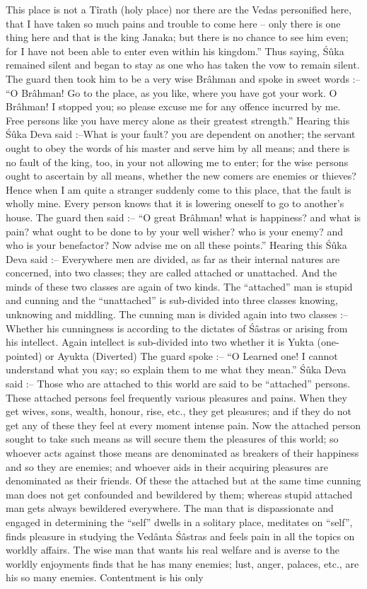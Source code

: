 This place is not a T\^irath (holy place) nor there are the Vedas personified here, that I have taken so much pains and trouble to come here -- only there is one thing here and that is the king Janaka; but there is no chance to see him even; for I have not been able to enter even within his kingdom.'' Thus saying, \'S\^uka remained silent and began to stay as one who has taken the vow to remain silent. The guard then took him to be a very wise Br\^ahman and spoke in sweet words :-- ``O Br\^ahman! Go to the place, as you like, where you have got your work. O Br\^ahman! I stopped you; so please excuse me for any offence incurred by me. Free persons like you have mercy alone as their greatest strength.'' Hearing this \'S\^uka Deva said :--What is your fault? you are dependent on another; the servant ought to obey the words of his master and serve him by all means; and there is no fault of the king, too, in your not allowing me to enter; for the wise persons ought to ascertain by all means, whether the new comers are enemies or thieves? Hence when I am quite a stranger suddenly come to this place, that the fault is wholly mine. Every person knows that it is lowering oneself to go to another's house. The guard then said :-- ``O great Br\^ahman! what is happiness? and what is pain? what ought to be done to by your well wisher? who is your enemy? and who is your benefactor? Now advise me on all these points.'' Hearing this \'S\^uka Deva said :-- Everywhere men are divided, as far as their internal natures are concerned, into two classes; they are called attached or unattached. And the minds of these two classes are again of two kinds. The ``attached'' man is stupid and cunning and the ``unattached'' is sub-divided into three classes knowing, unknowing and middling. The cunning man is divided again into two classes :-- Whether his cunningness is according to the dictates of \'S\^astras or arising from his intellect. Again intellect is sub-divided into two whether it is Yukta (one-pointed) or Ayukta (Diverted) The guard spoke :-- ``O Learned one! I cannot understand what you say; so explain them to me what they mean.'' \'S\^uka Deva said :-- Those who are attached to this world are said to be ``attached'' persons. These attached persons feel frequently various pleasures and pains. When they get wives, sons, wealth, honour, rise, etc., they get pleasures; and if they do not get any of these they feel at every moment intense pain. Now the attached person sought to take such means as will secure them the pleasures of this world; so whoever acts against those means are denominated as breakers of their happiness and so they are enemies; and whoever aids in their acquiring pleasures are denominated as their friends. Of these the attached but at the same time cunning man does not get confounded and bewildered by them; whereas stupid attached man gets always bewildered everywhere. The man that is dispassionate and engaged in determining the ``self'' dwells in a solitary place, meditates on ``self'', finds pleasure in studying the Ved\^anta  \'S\^astras and feels pain in all the topics on worldly affairs. The wise man that wants his real welfare and is averse to the worldly enjoyments finds that he has many enemies; lust, anger, palaces, etc., are his so many enemies. Contentment is his only 